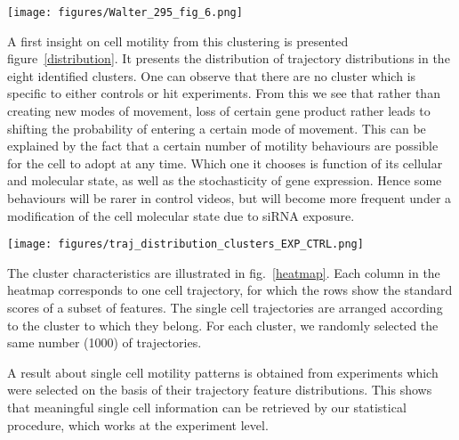 \begin{figure*}[!ht]
\centerline{\texttt{[image: figures/Walter\_295\_fig\_6.png]}}
\caption{Evaluation of k-means clustering quality as a function of the number of clusters (average and standard deviation on 10 algorithm initializations). The same protocol was applied to a subset of the Mitocheck dataset, and two samples of the same dimensions, respectively drawn from the Uniform and the Normal distributions. }
\label{clusterscore}
\end{figure*}

A first insight on cell motility from this clustering is presented
figure~\ref{distribution}. It presents the distribution of trajectory
distributions in the eight identified clusters. One can observe that
there are no cluster which is specific to either controls or
hit experiments. From this we see that rather than creating new
modes of movement, loss of  certain gene product rather leads to shifting the
probability of entering a certain mode of movement. 
This can be
explained by the fact that a certain number of motility behaviours are
possible for the cell to adopt at any time. Which one it chooses is
function of its cellular and molecular state, as well as the
stochasticity of gene expression. Hence some behaviours will be rarer
in control videos, but will become more
frequent under a modification of the cell molecular state due to siRNA
exposure. 

\begin{figure*}[!ht]
\centering
\texttt{[image: figures/traj\_distribution\_clusters\_EXP\_CTRL.png]}
\caption{Comparison of cluster distributions between controls (Ctrl) and experiments (Exp) for the eight trajectory clusters which were identified in the Mitocheck dataset. The clusters are in the same order as in figure ~\ref{heatmap}.}
\label{distribution}
\end{figure*}
 
The cluster characteristics are illustrated in fig.~\ref{heatmap}. Each
column in the heatmap corresponds to one cell trajectory, for which
the rows show the standard scores of a subset of features. The single
cell trajectories are arranged according to the cluster to which they
belong. For each cluster, we randomly selected the same number (1000) of
trajectories. 

A result about single cell motility patterns is obtained from
experiments which were selected on the basis of their trajectory
feature distributions. This shows that meaningful single cell
information can be retrieved by our statistical procedure, which works
at the experiment level. 

